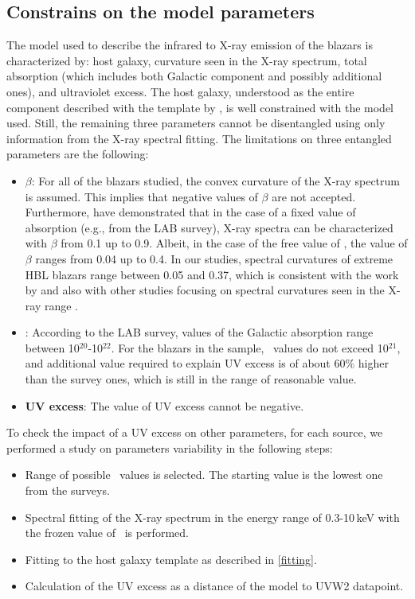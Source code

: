 \subsection{Constrains on the model parameters}
The model used to describe the infrared to X-ray emission of the blazars is characterized by: host galaxy, curvature seen in the X-ray spectrum, total absorption (which includes both Galactic component and possibly additional ones), and ultraviolet excess. 
The host galaxy, understood as the entire component described with the template by \cite{Silvathesis},  is well constrained with the model used. Still, the remaining three parameters cannot be disentangled using only information from the X-ray spectral fitting. 
The limitations on three entangled parameters are the following:

\begin{itemize}
 \item \textbf{$\beta$}: 
 For all of the blazars studied, the convex curvature of the X-ray spectrum is assumed. This implies that negative values of $\beta$ are not accepted. 
 Furthermore, \cite{Wierzcholska2016} have demonstrated that in the case of a fixed value of absorption (e.g., from the LAB survey), X-ray spectra can be characterized with $\beta$ from 0.1 up to 0.9. 
Albeit, in the case of the free value of \nh, the value of $\beta$ ranges from 0.04 up to 0.4. 
In our studies, spectral curvatures of extreme HBL blazars range between 0.05 and 0.37, which is consistent with the work by \cite{Wierzcholska2016} and also with other studies focusing on spectral curvatures seen in the X-ray range \citep[][]{Massaro2004, Tramacere2007}.
 \item \textbf{\nh}: According to the LAB survey, values of the Galactic absorption range between 10$^{20}$-10$^{22}$.
For the blazars in the sample, \nh\ values do not exceed 10$^{21}$, and additional value required to explain UV excess is of about 60$\%$ higher than the survey ones, which is still in the range of reasonable value. 
 \item \textbf{UV excess}: The value of UV excess cannot be negative. 
\end{itemize}




To check the impact of a UV excess  on other parameters, for each source, we performed a study on parameters variability in the following steps:
\begin{itemize}
 \item  Range of possible \nh\ values is selected. The starting value is the lowest one from the surveys.
 \item  Spectral fitting of the X-ray spectrum in the energy range of 0.3-10\,keV with the frozen value of \nh\ is performed. 
 \item  Fitting to the host galaxy template as described in \ref{fitting}.
 \item  Calculation of the UV excess as a distance of the model to UVW2 datapoint.
\end{itemize}


